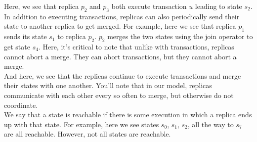 \begin{frame}
{    Here, we see that replica $p_2$ and $p_3$ both execute transaction $u$
    leading to state $s_2$. \\[12pt]

    In addition to executing transactions, replicas can also periodically send
    their state to another replica to get merged. For example, here we see that
    replica $p_1$ sends its state $s_1$ to replica $p_2$. $p_2$ merges the two
    states using the join operator to get state $s_4$. Here, it's critical to
    note that unlike with transactions, replicas cannot abort a merge. They
    can abort transactions, but they cannot abort a merge. \\[12pt]

    And here, we see that the replicas continue to execute transactions and
    merge their states with one another. You'll note that in our model,
    replicas communicate with each other every so often to merge, but otherwise
    do not coordinate. \\[12pt]

    We say that a state is reachable if there is some execution in which a
    replica ends up with that state. For example, here we see states $s_0$,
    $s_1$, $s_2$, all the way to $s_7$ are all reachable. However, not all
    states are reachable.

  }
\end{frame}

